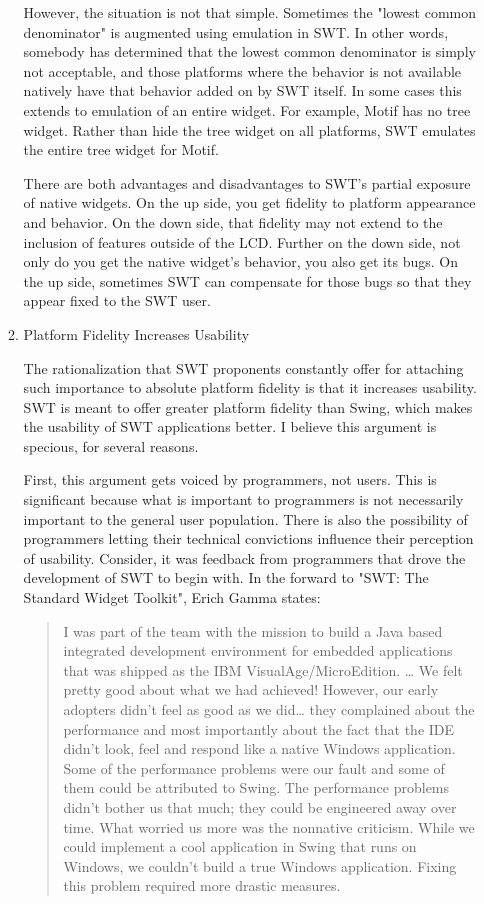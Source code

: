 \documentclass{article}
\begin{document}
\begin{enumerate}
\begin{enumerate}
However, the situation is not that simple. Sometimes the "lowest common
denominator" is augmented using emulation in SWT. In other words,
somebody has determined that the lowest common denominator is simply not
acceptable, and those platforms where the behavior is not available
natively have that behavior added on by SWT itself. In some cases this
extends to emulation of an entire widget. For example, Motif has no tree
widget. Rather than hide the tree widget on all platforms, SWT emulates
the entire tree widget for Motif.

There are both advantages and disadvantages to SWT's partial exposure of
native widgets. On the up side, you get fidelity to platform appearance
and behavior. On the down side, that fidelity may not extend to the
inclusion of features outside of the LCD. Further on the down side, not
only do you get the native widget's behavior, you also get its bugs. On
the up side, sometimes SWT can compensate for those bugs so that they
appear fixed to the SWT user.

\item Platform Fidelity Increases Usability
\label{sec:orgheadline294}

The rationalization that SWT proponents constantly offer for attaching
such importance to absolute platform fidelity is that it increases
usability. SWT is meant to offer greater platform fidelity than Swing,
which makes the usability of SWT applications better. I believe this
argument is specious, for several reasons.

First, this argument gets voiced by programmers, not users. This is
significant because what is important to programmers is not necessarily
important to the general user population. There is also the possibility
of programmers letting their technical convictions influence their
perception of usability. Consider, it was feedback from programmers that
drove the development of SWT to begin with. In the forward to "SWT: The
Standard Widget Toolkit", Erich Gamma states:

\begin{quote}
I was part of the team with the mission to build a Java based
integrated development environment for embedded applications that was
shipped as the IBM VisualAge/MicroEdition. \ldots{} We felt pretty good
about what we had achieved! However, our early adopters didn't feel as
good as we did\ldots{} they complained about the performance and most
importantly about the fact that the IDE didn't look, feel and respond
like a native Windows application. Some of the performance problems
were our fault and some of them could be attributed to Swing. The
performance problems didn't bother us that much; they could be
engineered away over time. What worried us more was the nonnative
criticism. While we could implement a cool application in Swing that
runs on Windows, we couldn't build a true Windows application. Fixing
this problem required more drastic measures.
\end{quote}


\end{enumerate}
\end{enumerate}
\end{document}
